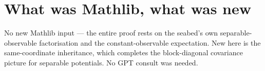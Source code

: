 \documentclass[11pt]{article}
\begin{document}
\section{What was Mathlib, what was new}
No new Mathlib input --- the entire proof rests on the seabed's own separable-observable factorisation
and the constant-observable expectation. New here is the same-coordinate inheritance, which completes
the block-diagonal covariance picture for separable potentials. No GPT consult was needed.
\end{document}
